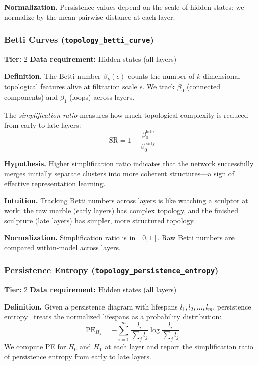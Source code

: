 \documentclass{article}
\begin{document}
\textbf{Normalization.} Persistence values depend on the scale of hidden states; we normalize by the mean pairwise distance at each layer.

\subsubsection{Betti Curves (\texttt{topology\_betti\_curve})}
\label{app:betti}

\textbf{Tier:} 2 \quad \textbf{Data requirement:} Hidden states (all layers)

\textbf{Definition.}
The Betti number $\beta_k(\epsilon)$ counts the number of $k$-dimensional topological features alive at filtration scale $\epsilon$. We track $\beta_0$ (connected components) and $\beta_1$ (loops) across layers.

The \emph{simplification ratio} measures how much topological complexity is reduced from early to late layers:
\begin{equation}
  \text{SR} = 1 - \frac{\beta_0^{\text{late}}}{\beta_0^{\text{early}}}
\end{equation}

\textbf{Hypothesis.}
Higher simplification ratio indicates that the network successfully merges initially separate clusters into more coherent structures---a sign of effective representation learning.

\textbf{Intuition.}
Tracking Betti numbers across layers is like watching a sculptor at work: the raw marble (early layers) has complex topology, and the finished sculpture (late layers) has simpler, more structured topology.

\textbf{Normalization.} Simplification ratio is in $[0, 1]$. Raw Betti numbers are compared within-model across layers.

\subsubsection{Persistence Entropy (\texttt{topology\_persistence\_entropy})}
\label{app:persistence-entropy}

\textbf{Tier:} 2 \quad \textbf{Data requirement:} Hidden states (all layers)

\textbf{Definition.}
Given a persistence diagram with lifespans $l_1, l_2, \ldots, l_m$, persistence entropy~\citep{rucco2016characterisation} treats the normalized lifespans as a probability distribution:
\begin{equation}
  \text{PE}_{H_k} = -\sum_{i=1}^{m} \frac{l_i}{\sum_j l_j} \log \frac{l_i}{\sum_j l_j}
\end{equation}
We compute PE for $H_0$ and $H_1$ at each layer and report the simplification ratio of persistence entropy from early to late layers.
\end{document}
